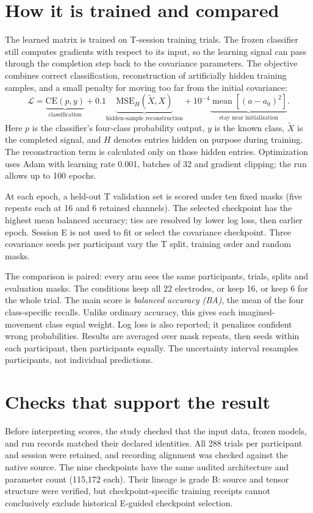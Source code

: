 \documentclass[11pt,a4paper]{article}
\begin{document}
\section{How it is trained and compared}
The learned matrix is trained on T-session training trials. The frozen classifier still computes gradients with respect to its input, so the learning signal can pass through the completion step back to the covariance parameters. The objective combines correct classification, reconstruction of artificially hidden training samples, and a small penalty for moving too far from the initial covariance:
\begin{equation}
 \mathcal L=\underbrace{\mathrm{CE}(p,y)}_{\text{classification}}+
 0.1\underbrace{\mathrm{MSE}_{H}(\widetilde X,X)}_{\text{hidden-sample reconstruction}}+
 10^{-4}\underbrace{\operatorname{mean}\!\left[(a-a_0)^2\right]}_{\text{stay near initialization}}.
 \label{eq:loss}
\end{equation}
Here $p$ is the classifier's four-class probability output, $y$ is the known class, $\widetilde X$ is the completed signal, and $H$ denotes entries hidden on purpose during training. The reconstruction term is calculated only on those hidden entries. Optimization uses Adam with learning rate 0.001, batches of 32 and gradient clipping; the run allows up to 100 epochs.

At each epoch, a held-out T validation set is scored under ten fixed masks (five repeats each at 16 and 6 retained channels). The selected checkpoint has the highest mean balanced accuracy; ties are resolved by lower log loss, then earlier epoch. Session E is not used to fit or select the covariance checkpoint. Three covariance seeds per participant vary the T split, training order and random masks.

The comparison is paired: every arm sees the same participants, trials, splits and evaluation masks. The conditions keep all 22 electrodes, or keep 16, or keep 6 for the whole trial. The main score is \emph{balanced accuracy (BA)}, the mean of the four class-specific recalls. Unlike ordinary accuracy, this gives each imagined-movement class equal weight. Log loss is also reported; it penalizes confident wrong probabilities. Results are averaged over mask repeats, then seeds within each participant, then participants equally. The uncertainty interval resamples participants, not individual predictions.

\section{Checks that support the result}
Before interpreting scores, the study checked that the input data, frozen models, and run records matched their declared identities. All 288 trials per participant and session were retained, and recording alignment was checked against the native source. The nine checkpoints have the same audited architecture and parameter count (115,172 each). Their lineage is grade B: source and tensor structure were verified, but checkpoint-specific training receipts cannot conclusively exclude historical E-guided checkpoint selection.
\end{document}
